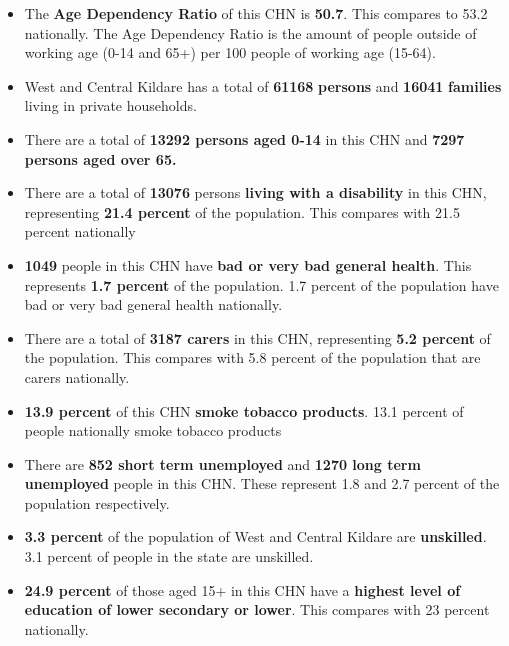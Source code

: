 \documentclass{article}
\begin{document}
\begin{itemize}

\item The \textbf{Age Dependency Ratio} of this CHN is  \textbf{50.7}. This compares to 53.2 nationally. The Age Dependency Ratio is the amount of people outside of working age (0-14 and 65+) per 100 people of working age (15-64). 

\item West and Central Kildare has a total of \textbf{\num{61168}} \textbf{persons} and  \textbf{\num{16041}} \textbf{families} living in private households.

\item There are a total of \textbf{\num{13292} persons aged 0-14} in this CHN and \textbf{\num{7297} persons aged over 65.} 

\item There are a total of \textbf{\num{13076}} persons \textbf{living with a disability} in this CHN, representing \textbf{21.4 percent} of the population. This compares with  21.5 percent nationally

\item \textbf{\num{1049}} people in this CHN have \textbf{bad or very bad general health}. This represents \textbf{1.7 percent} of the population. 1.7 percent of the population have bad or very bad general health nationally. 

\item There are a total of \textbf{\num{3187} carers} in this CHN, representing \textbf{5.2 percent} of the population. This compares with 5.8 percent of the population that are carers nationally. 

\item \textbf{13.9 percent} of this CHN \textbf{smoke tobacco products}. 13.1 percent of people nationally smoke tobacco products

\item There are \textbf{\num{852} short term unemployed} and \textbf{\num{1270} long term unemployed} people in this CHN. These represent 1.8 and 2.7 percent of the population respectively.

\item  \textbf{3.3 percent} of the population of West and Central Kildare are \textbf{unskilled}. 3.1 percent of people in the state are unskilled.

\item \textbf{24.9 percent} of those aged 15+ in this CHN have a \textbf{highest level of education of lower secondary or lower}. This compares with 23 percent nationally. 


\end{itemize}
\end{document}
